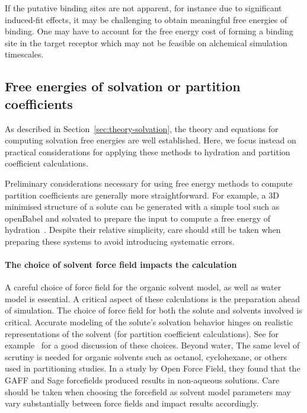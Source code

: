\documentclass[9pt,bestpractices]{livecoms}
\begin{document}
If the putative binding sites are not apparent, for instance due to significant induced-fit effects, it may be challenging to obtain meaningful free energies of binding. One may have to account for the free energy cost of forming a binding site in the target receptor which may not be feasible on alchemical simulation timescales.

\subsection{Free energies of solvation or partition coefficients}
As described in Section~\ref{sec:theory-solvation}, the theory and equations for computing solvation free energies are well established. Here, we focus instead on practical considerations for applying these methods to hydration and partition coefficient calculations.

\label{subsec:hydration}
Preliminary considerations necessary for using free energy methods to compute partition coefficients are generally more straightforward. For example, a 3D minimised structure of a solute can be generated with a simple tool such as openBabel and solvated to prepare the input to compute a free energy of hydration~\cite{oboyle2011open}. Despite their relative simplicity, care should still be taken when preparing these systems to avoid introducing systematic errors.

\paragraph{The choice of solvent force field impacts the calculation}
A careful choice of force field for the organic solvent model, as well as water model is essential. A critical aspect of these calculations is the preparation ahead of simulation. The choice of force field for both the solute and solvents involved is critical. Accurate modeling of the solute's solvation behavior hinges on realistic representations of the solvent (for partition coefficient calculations). See for example~\cite{bosisio2016blinded,rustenburg2016measuring} for a good discussion of these choices.  Beyond water, The same level of scrutiny is needed for organic solvents such as octanol, cyclohexane, or others used in partitioning studies. In a study by Open Force Field, they found that the GAFF\cite{wang2004gaff} and Sage \cite{boothroyd2023sage} forcefields produced results in non-aqueous solutions. Care should be taken when choosing the forcefield as solvent model parameters may vary substantially between force fields and impact results accordingly.
\end{document}
